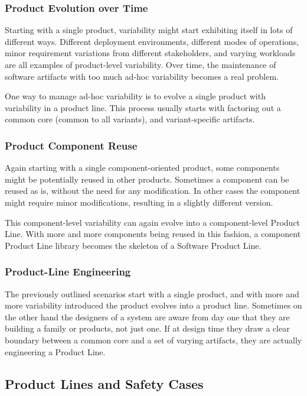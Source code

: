 \documentclass[11pt]{article}
\begin{document}
\subsubsection{Product Evolution over Time}

Starting with a single product, variability might start exhibiting itself in lots of different ways. Different deployment environments, different modes of operations, minor requirement variations from different stakeholders, and varying workloads are all examples of product-level variability. Over time, the maintenance of software artifacts with too much ad-hoc variability becomes a real problem. 

One way to manage ad-hoc variability is to evolve a single product with variability in a product line. This process usually starts with factoring out a common core (common to all variants), and variant-specific artifacts.

\subsubsection{Product Component Reuse}

Again starting with a single component-oriented product, some components might be potentially reused in other products. Sometimes a component can be reused as is, without the need for any modification. In other cases the component might require minor modifications, resulting in a slightly different version. 

This component-level variability can again evolve into a component-level Product Line. With more and more components being reused in this fashion, a component Product Line library becomes the skeleton of a Software Product Line.

\subsubsection{Product-Line Engineering}

The previously outlined scenarios start with a single product, and with more and more variability introduced the product evolves into a product line. Sometimes on the other hand the designers of a system are aware from day one that they are building a family or products, not just one. If at design time they draw a clear boundary between a common core and a set of varying artifacts, they are actually engineering a Product Line.

\subsection{Product Lines and Safety Cases}
\end{document}
